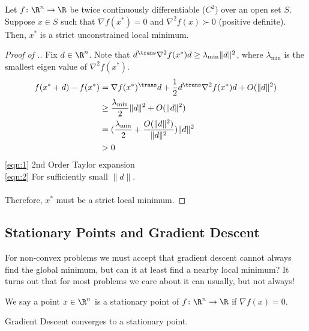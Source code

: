 \begin{proposition}
    Let $f\colon \R^n \to \R$ be twice continuously differentiable ($C^2$) over an open set $S$. Suppose $x \in S$ such that $\nabla f(x^*) = 0$ and $\nabla^2f(x) \succ 0$ (positive definite). Then, $x^*$ is a strict unconstrained local minimum.
\end{proposition}

\begin{proof}[Proof of .]
Fix $d \in \R^n$. Note that $d^\trans \nabla^2 f(x^*) d \ge \lambda_{\text{min}} \|d\|^2$, where $\lambda_\text{min}$ is the smallest eigen value of $\nabla^2 f(x^*)$.
\begin{align}
    f(x^* + d) - f(x^*) &= \nabla f(x^*)^\trans d + \frac{1}{2}d^\trans \nabla^2 f(x^*)d + O(\|d\|^2) \label{eqn:1}\\
    &\ge \frac{\lambda_{\text{min}}}{2} \|d\|^2 + O(\|d\|^2) \nonumber \\
    &= (\frac{\lambda_{\text{min}}}{2} + \frac{O(\|d\|^2)}{\|d\|^2}) \|d\|^2 \nonumber\\
    &> 0 \label{eqn:2}
\end{align}
\ref{eqn:1} 2nd Order Taylor expansion\\
\ref{eqn:2} For sufficiently small $\|d\|$.\\ 
\\
Therefore, $x^*$ must be a strict local minimum.
\end{proof}


\subsection{Stationary Points and Gradient Descent}

For non-convex problems we must accept that gradient descent cannot always find the global minimum, but can it at least find a nearby local minimum? It turns out that for most problems we care about it can usually, but not always!

\begin{definition}
We say a point $x \in \R^n$ is a stationary point of $f\colon \R^n \to \R$ if $\nabla f(x) = 0$.
\end{definition}

\begin{proposition}
Gradient Descent converges to a stationary point.
\end{proposition}


